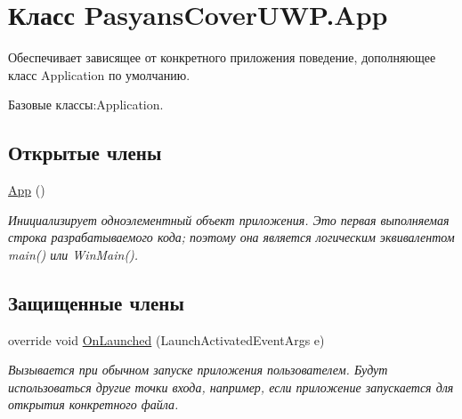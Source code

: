 \hypertarget{class_pasyans_cover_u_w_p_1_1_app}{}\section{Класс Pasyans\+Cover\+U\+W\+P.\+App}
\label{class_pasyans_cover_u_w_p_1_1_app}


Обеспечивает зависящее от конкретного приложения поведение, дополняющее класс Application по умолчанию.  




Базовые классы\+:Application.

\subsection*{Открытые члены}
\begin{DoxyCompactItemize}
\item 
\hyperlink{class_pasyans_cover_u_w_p_1_1_app_afd24d3b5e2849dcc9fdc1d27108b740e}{App} ()
\begin{DoxyCompactList}\small\item\em Инициализирует одноэлементный объект приложения. Это первая выполняемая строка разрабатываемого кода; поэтому она является логическим эквивалентом main() или Win\+Main(). \end{DoxyCompactList}\end{DoxyCompactItemize}
\subsection*{Защищенные члены}
\begin{DoxyCompactItemize}
\item 
override void \hyperlink{class_pasyans_cover_u_w_p_1_1_app_a263ee204ae6f7ebb28a3b8fb8cce8d71}{On\+Launched} (Launch\+Activated\+Event\+Args e)
\begin{DoxyCompactList}\small\item\em Вызывается при обычном запуске приложения пользователем. Будут использоваться другие точки входа, например, если приложение запускается для открытия конкретного файла. \end{DoxyCompactList}\end{DoxyCompactItemize}
